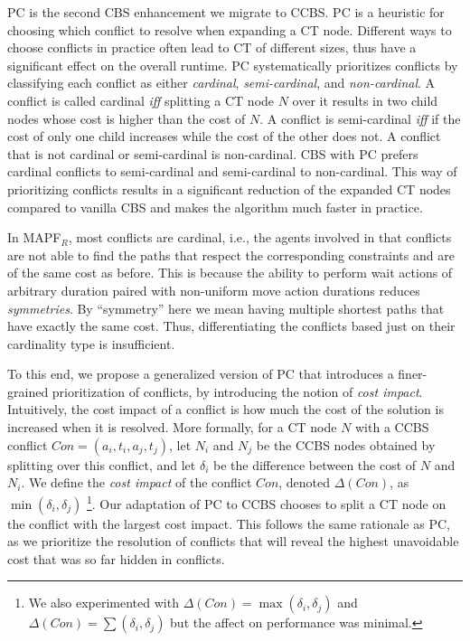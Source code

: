 \documentclass[letterpaper]{article} %
\newcommand{\cbs}{\ac{CBS}\xspace}
\newcommand{\ccbs}{\ac{CCBS}\xspace}
\newcommand{\ct}{\ac{CT}\xspace}
\newcommand{\mapfr}{{MAPF}$_R$\xspace}
\newcommand{\pc}{\ac{PC}\xspace}
\begin{document}
\acf{PC} \cite{BoyarskiFSSTBS15} is the second \cbs enhancement we migrate to \ccbs. 
\pc is a heuristic for choosing which conflict to resolve when expanding a \ct node. 
Different ways to choose conflicts in practice often lead to \ct of different sizes, 
thus have a significant effect on the overall runtime. 
\pc systematically prioritizes conflicts by classifying each conflict as either \emph{cardinal}, \emph{semi-cardinal}, and \emph{non-cardinal}. 
A conflict is called cardinal \emph{iff} splitting a \ct node $N$ over it results in two child nodes
whose cost is higher than the cost of $N$. 
A conflict is semi-cardinal \emph{iff} if the cost of only one child increases while the cost of the other does not. 
A conflict that is not cardinal or semi-cardinal is non-cardinal. 
\cbs with \pc prefers cardinal conflicts to semi-cardinal and semi-cardinal to non-cardinal.  
This way of prioritizing conflicts results in a significant reduction of the expanded \ct nodes compared to vanilla \cbs and makes the algorithm much faster in practice.

In \mapfr, most conflicts are cardinal, i.e., the agents involved in that conflicts are not able to find the paths that respect the corresponding constraints and are of the same cost as before. 
This is because the ability to perform wait actions of arbitrary duration paired with non-uniform move action durations reduces \emph{symmetries}. 
By ``symmetry'' here we mean having multiple shortest paths that have exactly the same cost. 
Thus, differentiating the conflicts based just on their cardinality type is insufficient.

To this end, we propose a generalized version of \pc that introduces a finer-grained prioritization of conflicts, by introducing the notion of \emph{cost impact}. 
Intuitively, the cost impact of a conflict is how much the cost of the solution is increased when it is resolved. More formally, for a \ct node $N$ with a \ccbs conflict $Con=(a_i, t_i, a_j, t_j)$, 
let $N_i$ and $N_j$ be the \ccbs nodes obtained by splitting over this conflict, 
and let $\delta_i$ be the difference between the cost of $N$ and $N_i$. 
We define the \emph{cost impact} of the conflict $Con$, denoted $\Delta(Con)$, as $\min(\delta_i, \delta_j)$ \footnote{We also experimented with $\Delta(Con) = \max(\delta_i, \delta_j)$ and $\Delta(Con) = \sum(\delta_i, \delta_j)$ but the affect on performance was minimal.}.
Our adaptation of \pc to \ccbs chooses to split a \ct node on the conflict with the largest cost impact. This follows the same rationale as \pc, as we prioritize the resolution of conflicts that will
reveal the highest unavoidable cost that was so far hidden in conflicts.
\end{document}

